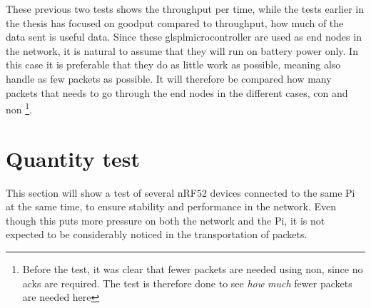 These previous two tests shows the throughput per time, while the tests earlier in the thesis has focused on goodput compared to throughput, how much of the data sent is useful data. Since these glspl{microcontroller} are used as end nodes in the network, it is natural to assume that they will run on battery power only. In this case it is preferable that they do as little work as possible, meaning also handle as few packets as possible. It will therefore be compared how many packets that needs to go through the end nodes in the different cases, \gls{con} and \gls{non} \footnote{Before the test, it was clear that fewer packets are needed using \gls{non}, since no \glspl{ack} are required. The test is therefore done to see \textit{how much} fewer packets are needed here}. 




\section{Quantity test}

This section will show a test of several nRF52 devices connected to the same Pi at the same time, to ensure stability and performance in the network. Even though this puts more pressure on both the network and the Pi, it is not expected to be considerably noticed in the transportation of packets. 



